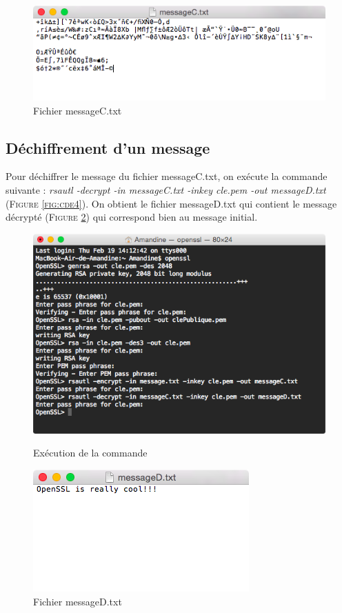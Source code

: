 \documentclass[11pt]{article}
\begin{document}
\begin{figure}[hbtp]
        \centering \includegraphics[scale=0.4]{Capture/question4c.png}
        \caption{Fichier messageC.txt}
         \label{fig:crypt}
\end{figure}

\subsection{Déchiffrement d'un message}
Pour déchiffrer le message du fichier messageC.txt, on exécute la commande suivante : \textit{rsautl -decrypt -in messageC.txt -inkey cle.pem -out messageD.txt} (\textsc{Figure \ref{fig:cde4}}). On obtient le fichier messageD.txt qui contient le message décrypté (\textsc{Figure \ref{fig:decrypt}}) qui correspond bien au message initial.

\begin{figure}[hbtp]
    \begin{minipage}[b]{0.4\linewidth}
        \centering \includegraphics[scale=0.4]{Capture/question5.png}
        \caption{Exécution de la commande}
                \label{fig:cde4}
\label{fig:base}
    \end{minipage}\hfill
    \begin{minipage}[b]{0.48\linewidth}
        \centering \includegraphics[scale=0.4]{Capture/question5b.png}
        \caption{Fichier messageD.txt}
         \label{fig:decrypt}
    \end{minipage}
\end{figure}
\newpage
\end{document}
